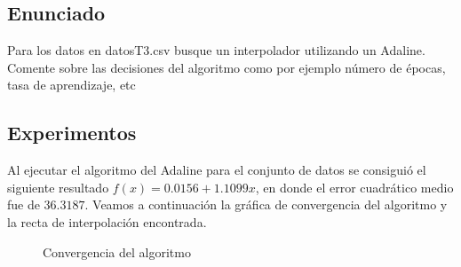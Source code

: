 \documentclass{article}
\theoremstyle{mytheoremstyle}
\theoremstyle{mytheoremstyle}
\theoremstyle{myproblemstyle}
\begin{document}
\subsection*{Enunciado}

Para los datos en datosT3.csv busque un interpolador utilizando un Adaline. Comente sobre las decisiones del algoritmo como por ejemplo número de épocas, tasa de aprendizaje, etc

\subsection*{Experimentos}

Al ejecutar el algoritmo del Adaline para el conjunto de datos se consiguió el siguiente resultado $f(x) = 0.0156 + 1.1099x$, en donde el error cuadrático medio fue de $36.3187$. Veamos a continuación la gráfica de convergencia del algoritmo y la recta de interpolación encontrada.

\vspace{0.2cm}

\begin{figure}[!ht]
  \centering
  \caption{Convergencia del algoritmo}
\end{figure}

\newpage
\begin{figure}[!ht]
  \centering
\end{figure}
\end{document}
